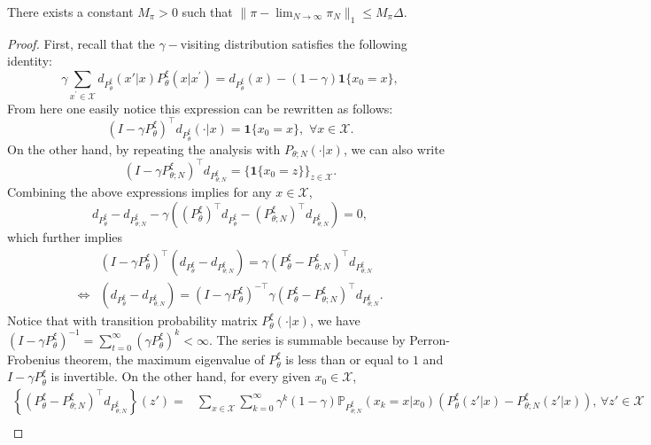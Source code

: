 \begin{lemma}\label{lem:tech_3}
There exists a constant $M_\pi>0$ such that
$
\|\pi-\lim_{N\rightarrow\infty}\pi_{N}\|_1\leq M_\pi\Delta.
$
\end{lemma}
\begin{proof}
First, recall that the $\gamma-$visiting distribution satisfies the following identity:
\begin{equation}\label{eq:feas_1}
\gamma\sum_{x^\prime\in \mathcal{X}}d_{{P}^\xi_{\theta}}(x'|x)
P^\xi_{\theta}(x|x^\prime)
=d_{{P}^\xi_{\theta}}(x)-(1-\gamma)\mathbf 1\{x_0=x\},
\end{equation}
From here one easily notice this expression can be rewritten as follows:
\[
\left(I-\gamma  P^\xi_\theta\right)^\top d_{{P}^\xi_{\theta}}(\cdot|x)=\mathbf 1\{x_0=x\},\,\,\forall {x\in\mathcal X}.
\]
On the other hand, by repeating the analysis with $P_{\theta;N}(\cdot|x)$, we can also write
\[
\left(I-\gamma P^\xi_{\theta;N}\right)^\top d_{{P}^\xi_{\theta;N}}=\{\mathbf 1\{x_0=z\}\}_{z\in\mathcal X}.
\]
Combining the above expressions implies for any $x\in\mathcal X$,
\[
d_{{P}^\xi_{\theta}}-d_{{P}^\xi_{\theta;N}}-\gamma \left(\left(P^\xi_\theta\right)^\top d_{{P}^\xi_{\theta}}-(P^\xi_{\theta;N})^\top d_{{P}^\xi_{\theta;N}}\right)=0,
\]
which further implies
\[
\begin{split}
& \left(I-\gamma  P^\xi_\theta\right)^\top\left(d_{{P}^\xi_{\theta}}-d_{{P}^\xi_{\theta;N}}\right)=\gamma \left(P^\xi_\theta -P^\xi_{\theta;N} \right)^\top d_{{P}^\xi_{\theta;N}}\\
\iff & \left(d_{{P}^\xi_{\theta}}-d_{{P}^\xi_{\theta;N}}\right)=\left(I-\gamma P^\xi_\theta\right)^{-\top}\gamma \left(P^\xi_\theta -P^\xi_{\theta;N} \right)^\top d_{{P}^\xi_{\theta;N}}.
\end{split}
\]
Notice that with transition probability matrix $  P^\xi_\theta(\cdot|x)$, we have $(I-\gamma P^\xi_\theta)^{-1}=\sum_{t=0}^\infty\left(\gamma  P^\xi_\theta\right)^k<\infty$. The series is summable because by Perron-Frobenius theorem, the maximum eigenvalue of $P^\xi_\theta$ is less than or equal to $1$ and $I-\gamma P^\xi_\theta$ is invertible. On the other hand, for every given $x_0\in\mathcal X$,
\[
\begin{split}
\left\{\left(P^\xi_\theta -P^\xi_{\theta;N} \right)^\top d_{{P}^\xi_{\theta;N}}\right\}(z')=&\sum_{x\in\mathcal X}\sum_{k=0}^\infty \gamma^k(1-\gamma)\mathbb P_{{P}^\xi_{\theta;N}}(x_k=x|x_0)\left( P^\xi_\theta(z'|x)-P^\xi_{\theta;N}(z'|x)\right),\,\forall z'\in\mathcal X\\

\end{split}\]
\end{proof}
